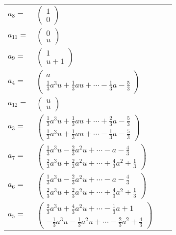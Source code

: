 \documentclass[1p]{elsarticle_modified}
\theoremstyle{definition}
\begin{document}
\begin{tabular}{m{7pt} m{180pt} m{7pt} m{180pt} }
\flushright $a_{8}=$&$\begin{pmatrix}1\\0\end{pmatrix}$ \\
\flushright $a_{11}=$&$\begin{pmatrix}0\\u\end{pmatrix}$ \\
\flushright $a_{9}=$&$\begin{pmatrix}1\\u+1\end{pmatrix}$ \\
\flushright $a_{4}=$&$\begin{pmatrix}a\\\frac{1}{3} a^3 u+\frac{1}{3} a u+\cdots-\frac{1}{3} a-\frac{5}{3}\end{pmatrix}$ \\
\flushright $a_{12}=$&$\begin{pmatrix}u\\u\end{pmatrix}$ \\
\flushright $a_{3}=$&$\begin{pmatrix}\frac{1}{3} a^3 u+\frac{1}{3} a u+\cdots+\frac{2}{3} a-\frac{5}{3}\\\frac{1}{3} a^3 u+\frac{1}{3} a u+\cdots-\frac{1}{3} a-\frac{5}{3}\end{pmatrix}$ \\
\flushright $a_{7}=$&$\begin{pmatrix}\frac{1}{3} a^3 u-\frac{2}{3} a^2 u+\cdots- a-\frac{4}{3}\\\frac{2}{3} a^3 u+\frac{2}{3} a^2 u+\cdots+\frac{4}{3} a^2+\frac{1}{3}\end{pmatrix}$ \\
\flushright $a_{6}=$&$\begin{pmatrix}\frac{1}{3} a^3 u-\frac{2}{3} a^2 u+\cdots- a-\frac{4}{3}\\\frac{2}{3} a^3 u+\frac{2}{3} a^2 u+\cdots+\frac{4}{3} a^2+\frac{1}{3}\end{pmatrix}$ \\
\flushright $a_{5}=$&$\begin{pmatrix}\frac{2}{3} a^3 u+\frac{4}{3} a^2 u+\cdots-\frac{1}{3} a+1\\-\frac{1}{3} a^3 u-\frac{1}{3} a^2 u+\cdots-\frac{2}{3} a^2+\frac{4}{3}\end{pmatrix}$ \\

\end{tabular}
\end{document}
